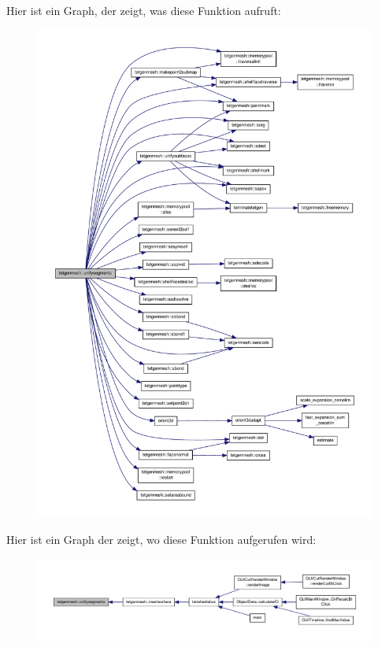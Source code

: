 Hier ist ein Graph, der zeigt, was diese Funktion aufruft\-:
\nopagebreak
\begin{figure}[H]
\begin{center}
\leavevmode
\includegraphics[width=350pt]{classtetgenmesh_adcb0e0e582808c23829b42708a7596dc_cgraph}
\end{center}
\end{figure}




Hier ist ein Graph der zeigt, wo diese Funktion aufgerufen wird\-:
\nopagebreak
\begin{figure}[H]
\begin{center}
\leavevmode
\includegraphics[width=350pt]{classtetgenmesh_adcb0e0e582808c23829b42708a7596dc_icgraph}
\end{center}
\end{figure}


